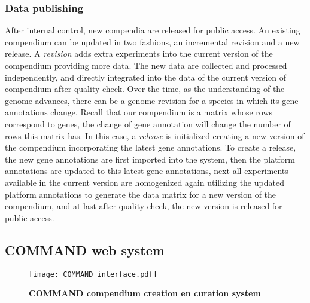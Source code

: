 \subsubsection{Data publishing}
After internal control, new compendia are released for public access. An existing compendium can be updated in two fashions, an incremental revision and a new release. A \textit{revision} adds extra experiments into the current version of the compendium providing more data. The new data are collected and processed independently, and directly integrated into the data of the current version of compendium after quality check. Over the time, as the understanding of the genome advances, there can be a genome revision for a species in which its gene annotations change. Recall that our compendium is a matrix whose rows correspond to genes, the change of gene annotation will change the number of rows this matrix has. In this case, a \textit{release} is initialized creating a new version of the compendium incorporating the latest gene annotations. To create a release, the new gene annotations are first imported into the system, then the platform annotations are updated to this latest gene annotations, next all experiments available in the current version are homogenized again utilizing the updated platform annotations to generate the data matrix for a new version of the compendium, and at last after quality check, the new version is released for public access.








\subsection{COMMAND web system} 

\begin{figure}
  \centering
  \texttt{[image: COMMAND\_interface.pdf]}
  \caption[COMMAND compendium creation en curation system]{
    \textbf{COMMAND compendium creation en curation system}}
  \label{fig:command-interface}
\end{figure}

